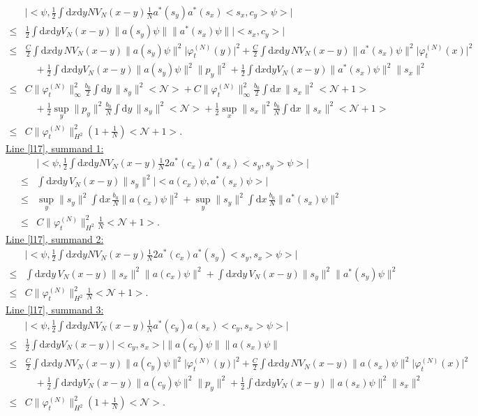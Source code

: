 \documentclass[11pt,a4paper]{scrartcl}
\newcommand{\di}{\textrm{d}}		%
\newcommand{\Ncal}{\mathcal{N}}		%
\newcommand{\estlist}[2]{\underline{Line \ref{l#1}, summand #2:}}
\newcommand{\scal}[2]{\big<#1,#2\big>} %
\newcommand{\norm}[1]{\lVert#1\rVert}	%
\newcommand{\ev}[1]{\big<#1\big>}	%
\newcommand{\ph}{\varphi_t^{(N)}}	%
\newcommand{\dxyNV}{\frac{1}{2}\int \di x\di y N V_N(x-y)} %
\newcommand{\dxyV}{\frac{1}{2}\int \di x\di y V_N(x-y)} %
\begin{document}
\begin{align*}
 & \lvert \scal{\psi}{\dxyNV \frac{1}{N}a^\ast(s_y)a^\ast(s_x)\scal{s_x}{c_y}\psi} \rvert \\
\leq & \dxyV \norm{a(s_y)\psi} \norm{a^\ast(s_x)\psi} \lvert\scal{s_x}{c_y}\rvert \\
\leq & \frac{C}{2}\int \di x\di y\, N V_N(x-y) \norm{a(s_y)\psi}^2 \lvert\ph(y)\rvert^2 + \frac{C}{2}\int \di x\di y\, N V_N(x-y) \norm{a^\ast(s_x)\psi}^2 \lvert \ph(x)\rvert^2 \\
& \quad + \dxyV \norm{a(s_y)\psi}^2 \norm{p_y}^2 + \dxyV \norm{a^\ast(s_x)\psi}^2 \norm{s_x}^2 \\
\leq & C\norm{\ph}_\infty^2\frac{b_0}{2} \int \di y\, \norm{s_y}^2 \ev{\Ncal} + C \norm{\ph}_\infty^2 \frac{b_0}{2} \int \di x\, \norm{s_x}^2 \ev{\Ncal+1} \\
& \quad + \frac{1}{2} \sup_y \norm{p_y}^2 \frac{b_0}{N} \int \di y\, \norm{s_y}^2 \ev{\Ncal} + \frac{1}{2} \sup_x \norm{s_x}^2 \frac{b_0}{N} \int \di x\, \norm{s_x}^2 \ev{\Ncal+1}\\
\leq & C \norm{\ph}_{H^2}^2 (1+\frac{1}{N})\ev{\Ncal+1}.
\end{align*}
\estlist{17}{1}
\begin{align*}
 & \lvert \scal{\psi}{\dxyNV \frac{1}{N}2 a^\ast(c_x)a^\ast(s_x) \scal{s_y}{s_y}\psi} \rvert \\
\leq & \int \di x\di y\, V_N(x-y) \norm{s_y}^2 \lvert \scal{a(c_x)\psi}{a^\ast(s_x)\psi}\rvert \\
\leq & \sup_y \norm{s_y}^2 \int \di x\, \frac{b_0}{N} \norm{a(c_x)\psi}^2 + \sup_y \norm{s_y}^2 \int \di x\, \frac{b_0}{N} \norm{a^\ast(s_x)\psi}^2 \\
\leq & C \norm{\ph}_{H^2}^2 \frac{1}{N}\ev{\Ncal+1}.
\end{align*}
\estlist{17}{2}
\begin{align*}
& \lvert \scal{\psi}{\dxyNV \frac{1}{N} 2 a^\ast(c_x) a^\ast(s_y) \scal{s_y}{s_x} \psi} \rvert \\
\leq & \int \di x\di y\, V_N(x-y) \norm{s_x}^2 \norm{a(c_x)\psi}^2 + 
\int \di x\di y\, V_N(x-y) \norm{s_y}^2 \norm{a^\ast(s_y)\psi}^2 \\
\leq & C \norm{\ph}_{H^2}^2 \frac{1}{N}\ev{\Ncal+1}.
\end{align*}
\estlist{17}{3}
\begin{align*}
& \lvert \scal{\psi}{\dxyNV \frac{1}{N} a^\ast(c_y) a(s_x) \scal{c_y}{s_x} \psi} \rvert \\
\leq & \dxyV \lvert \scal{c_y}{s_x} \rvert \norm{a(c_y)\psi} \norm{a(s_x)\psi} \\
\leq & \frac{C}{2}\int \di x\di y\, N V_N(x-y) \norm{a(c_y)\psi}^2 \lvert\ph(y)\rvert^2 + \frac{C}{2}\int \di x\di y\, N V_N(x-y) \norm{a(s_x)\psi}^2 \lvert \ph(x)\rvert^2 \\
& \quad + \dxyV \norm{a(c_y)\psi}^2 \norm{p_y}^2 + \dxyV \norm{a(s_x)\psi}^2 \norm{s_x}^2 \\
\leq & C \norm{\ph}_{H^2}^2 (1+\frac{1}{N})\ev{\Ncal}.
\end{align*}
\end{document}
